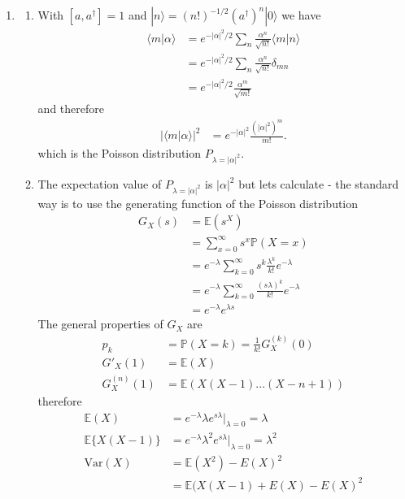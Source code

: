 \documentclass{article}
\begin{document}
\begin{enumerate}
\begin{enumerate}
    \end{enumerate}
    \item
    \begin{enumerate}
    \item With $[a,a^\dagger]=1$ and $|n\rangle=(n!)^{-1/2}(a^\dagger)^n|0\rangle$ we have
    \begin{align}
        \langle m|\alpha\rangle
        &=e^{-|\alpha|^2/2}\sum_n\frac{\alpha^n}{\sqrt{n!}}\langle m|n\rangle\\
        &=e^{-|\alpha|^2/2}\sum_n\frac{\alpha^n}{\sqrt{n!}}\delta_{mn}\\
        &=e^{-|\alpha|^2/2}\frac{\alpha^m}{\sqrt{m!}}
    \end{align}
    and therefore
    \begin{align}
        |\langle m|\alpha\rangle|^2
        &=e^{-|\alpha|^2}\frac{(|\alpha|^{2})^m}{m!}.
    \end{align}
    which is the Poisson distribution $P_{\lambda=|\alpha|^2}$.
    \item The expectation value of $P_{\lambda=|\alpha|^2}$ is $|\alpha|^2$ but lets calculate - the standard way is to use the generating function of the Poisson distribution
    \begin{align}
        G_X(s)&=\mathbb{E}(s^X)\\
        &=\sum_{x=0}^\infty s^x\mathbb{P}(X=x)\\
        &=e^{-\lambda}\sum_{k=0}^\infty s^k\frac{\lambda^k}{k!}e^{-\lambda}\\
        &=e^{-\lambda}\sum_{k=0}^\infty \frac{(s\lambda)^k}{k!}e^{-\lambda}\\
        &=e^{-\lambda}e^{\lambda s}
    \end{align}
    The general properties of $G_X$ are
    \begin{align}
        p_k&=\mathbb{P}(X=k)=\frac{1}{k!}G^{(k)}_X(0)\\
        G'_X(1)&=\mathbb{E}(X)\\
        G^{(n)}_X(1)&=\mathbb{E}(X(X-1)...(X-n+1))
    \end{align}
    therefore 
    \begin{align}
        \mathbb{E}(X)&=e^{-\lambda}\lambda e^{s\lambda}|_{\lambda=0}=\lambda\\
        \mathbb{E}\{X(X-1)\}&=e^{-\lambda}\lambda^2 e^{s\lambda}|_{\lambda=0}=\lambda^2\\
        \text{Var}(X)&=\mathbb{E}(X^2)-E(X)^2\\
        &=\mathbb{E}(X(X-1)+E(X)-E(X)^2\\

\end{align}
\end{enumerate}
\end{enumerate}
\end{document}
